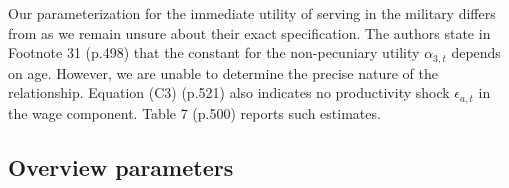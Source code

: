 \begin{Remark} Our parameterization for the immediate utility of serving in the military differs from \citet{Keane.1997} as we remain unsure about their exact specification. The authors state in Footnote 31 (p.498) that the constant for the non-pecuniary utility $\alpha_{3,t}$ depends on age. However, we are unable to determine the precise nature of the relationship. Equation (C3) (p.521) also indicates no productivity shock $\epsilon_{a,t}$ in the wage component. Table 7 (p.500) reports such estimates.
\end{Remark}
\FloatBarrier\subsection{Overview parameters}


